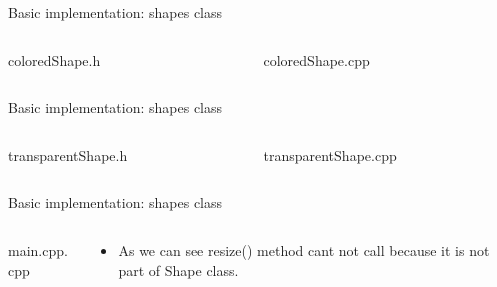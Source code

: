 \documentclass[13pt]{beamer}
\begin{document}
\begin{frame}{Basic implementation: shapes class}
\begin{columns}[T]
\begin{column}{.45\textwidth}
\lstset{basicstyle=\tiny,style=myCustomCppStyle}
coloredShape.h

\end{column}

\begin{column}{.45\textwidth}
\lstset{basicstyle=\tiny,style=myCustomCppStyle}
coloredShape.cpp

\end{column}
\end{columns}
\end{frame}

\begin{frame}{Basic implementation: shapes class}
\begin{columns}[T]
\begin{column}{.45\textwidth}
\lstset{basicstyle=\tiny,style=myCustomCppStyle}
transparentShape.h

\end{column}

\begin{column}{.45\textwidth}
\lstset{basicstyle=\tiny,style=myCustomCppStyle}
transparentShape.cpp

\end{column}
\end{columns}
\end{frame}

\begin{frame}{Basic implementation: shapes class}
\begin{columns}[T]
\begin{column}{.45\textwidth}
\lstset{basicstyle=\tiny,style=myCustomCppStyle}
main.cpp.cpp

\end{column}

\begin{column}{.45\textwidth}
\lstset{basicstyle=\tiny,style=myCustomCppStyle}
	\begin{itemize}
		\item As we can see resize() method cant not call because it is not part of Shape class.
	\end{itemize}
\end{column}
\end{columns}
\end{frame}
\end{document}
